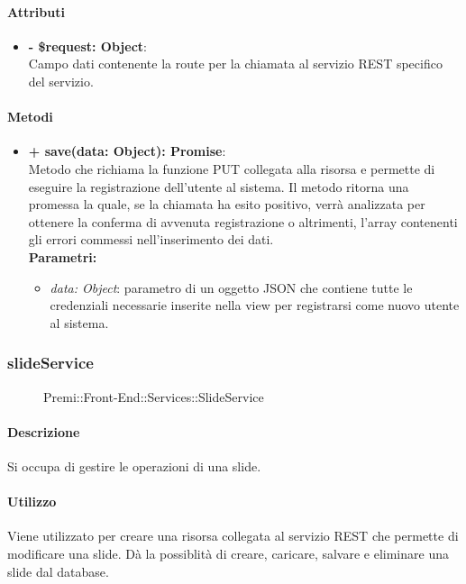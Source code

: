 	\paragraph{Attributi}
	\begin{itemize}
		\item \textbf{- \$request: Object}:\\
		Campo dati contenente la route per la chiamata al servizio REST specifico del servizio.
	\end{itemize}	
	
	\paragraph{Metodi}
	\begin{itemize}
		\item \textbf{+ save(data: Object): Promise}:\\
		Metodo che richiama la funzione PUT collegata alla risorsa e permette di eseguire la registrazione dell'utente al sistema. Il metodo ritorna una promessa la quale, se la chiamata ha esito positivo, verrà analizzata per ottenere la conferma di avvenuta registrazione o altrimenti, l'array contenenti gli errori commessi nell'inserimento dei dati.\\
		\textbf{Parametri:}\\
		\begin{itemize}
			\item \textit{data: Object}: parametro di un oggetto JSON che contiene tutte le credenziali necessarie inserite nella view per registrarsi come nuovo utente al sistema.
		\end{itemize}
	\end{itemize}


\subsubsection{slideService}
	\begin{figure}[h]
		\centering
		\caption[Premi::Front-End::Services::SlideService]{Premi::Front-End::Services::SlideService}
	\end{figure}
	
	\paragraph{Descrizione}
	Si occupa di gestire le operazioni di una slide.
	
	\paragraph{Utilizzo}
	Viene utilizzato per creare una risorsa collegata al servizio REST che permette di modificare una slide. Dà la possiblità di creare, caricare, salvare e eliminare una slide dal database.
	
